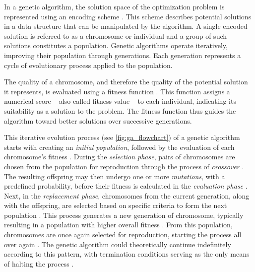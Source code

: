 \documentclass[english,examples]{isasthesis}
\begin{document}
In a genetic algorithm, the solution space of the optimization problem is
represented using an encoding scheme \cite{goldberg1989}.
This scheme describes potential solutions in a data structure that can be
manipulated by the algorithm.
A single encoded solution is referred to as a chromosome or individual and
a group of such solutions constitutes a population.
Genetic algorithms operate iteratively, improving their population through
generations. Each generation represents a cycle of evolutionary process applied
to the population.

The quality of a chromosome, and therefore the quality of the potential solution
it represents, is evaluated using a fitness function
\cite{goldberg1989,Affenzeller2009}.
This function assigns a numerical score -- also called fitness value -- to each
individual, indicating its suitability as a solution to the problem.
The fitness function thus guides the algorithm toward better solutions over
successive generations.

This iterative evolution process (see \ref{fig:ga_flowchart}) of a genetic
algorithm starts with creating an \textit{initial population}, followed
by the evaluation of each chromosome's fitness \cite{Affenzeller2009}.
During the \textit{selection phase}, pairs of chromosomes are chosen from the
population for reproduction through the process of \textit{crossover}
\cite{Affenzeller2009}. The resulting offspring may then undergo one or more
\textit{mutations}, with a predefined probability, before their fitness is
calculated in the \textit{evaluation phase} \cite{Affenzeller2009}.
Next, in the \textit{replacement phase}, chromosomes from the current
generation, along with the offspring, are selected based on specific criteria
to form the next population \cite{Affenzeller2009}.
This process generates a new generation of chromosome, typically resulting in a
population with higher overall fitness \cite{Affenzeller2009}.
From this population, chromosomes are once again selected for reproduction,
starting the process all over again \cite{Affenzeller2009}.
The genetic algorithm could theoretically continue indefinitely according to
this pattern, with termination conditions serving as the only means of halting
the process \cite{Beligiannis2009}.

\end{document}
